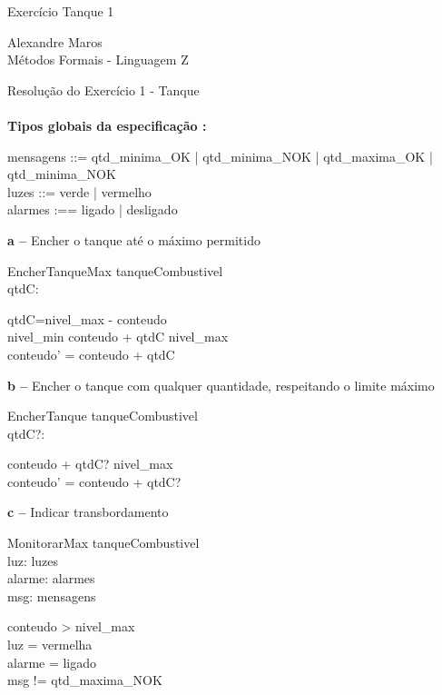 \documentclass{article}
\begin{document}
\begin{center}
    \huge  Exercício Tanque 1\\
\end{center}

\begin{center}
    Alexandre Maros\\
    Métodos Formais - Linguagem Z\\
\end{center}
\vspace{1.5cm}

Resolução do Exercício 1 - Tanque\\\\

\textbf{Tipos globais da especificação :}

\begin{zed}
   mensagens ::= qtd\_minima\_OK | qtd\_minima\_NOK | qtd\_maxima\_OK | qtd\_minima\_NOK\\
   luzes ::= verde | vermelho\\
   alarmes :== ligado | desligado
\end{zed}

\textbf{a --} Encher o tanque até o máximo permitido\\
\begin{schema}{EncherTanqueMax}
    \Delta tanqueCombustivel\\
    qtdC: \nat
    
    \where
    
    qtdC=nivel\_max - conteudo\\
    \heq nivel\_min \leq conteudo + qtdC \leq nivel\_max\\
    conteudo' = conteudo + qtdC
\end{schema}

\textbf{b --} Encher o tanque com qualquer quantidade, respeitando o limite máximo
\begin{schema}{EncherTanque}
    \Delta tanqueCombustivel\\
    qtdC?: \nat
    
    \where
    
    conteudo + qtdC? \leq nivel\_max\\
    conteudo' = conteudo + qtdC?
\end{schema}

\textbf{c --} Indicar transbordamento
\begin{schema}{MonitorarMax}
    \Xi tanqueCombustivel\\
    luz: luzes\\
    alarme: alarmes\\
    msg: mensagens
    
    \where
    
    conteudo > nivel\_max\\
    luz = vermelha\\
    alarme = ligado\\
    msg != qtd\_maxima\_NOK
\end{schema}
\end{document}

